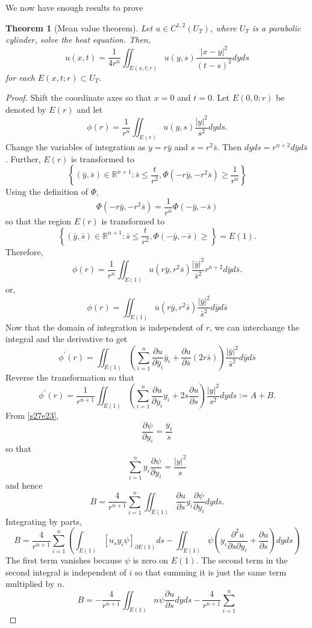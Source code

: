 \documentclass{article}
\newcommand{\pd}[2]{\frac{\partial{#1}}{\partial{#2}}}
\theoremstyle{plain}
\newtheorem{thm}{Theorem}
\numberwithin{thm}{section}
\theoremstyle{plain}
\numberwithin{prop}{section}
\theoremstyle{definition}
\numberwithin{defn}{section}
\theoremstyle{remark}
\numberwithin{equation}{section}
\begin{document}
We now have enough results to prove
\begin{thm}[Mean value theorem]\label{s27t3}
Let $u \in C^{1, 2}(U_T)$, where $U_T$ is a parabolic cylinder, solve the heat equation. Then,
\[
u(x, t) = \frac{1}{4r^n}\iint_{E(x,t;r)} u(y, s)\frac{|x - y|^2}{(t - s)^2}dyds
\]
for each $E(x,t;r) \subset U_T$.
\end{thm}
\begin{proof}
Shift the coordinate axes so that $x = 0$ and $t = 0$. Let $E(0, 0; r)$ be denoted by $E(r)$ and let
\[
\phi(r) = \frac{1}{r^n}\iint_{E(r)} u(y, s)\frac{|y|^2}{s^2}dyds.
\]
Change the variables of integration as $y = r\bar{y}$ and $s = r^2\bar{s}$. Then $dyds = r^{n+2}d\bar{y} 
d\bar{s}$. Further, $E(r)$ is transformed to
\[
\left\{(\bar{y}, \bar{s}) \in \mathbb{R}^{n+1}: \bar{s} \le \frac{t}{r^2}, 
\Phi\left(-r\bar{y}, -r^2\bar{s}\right) \ge \frac{1}{r^n}\right\}
\]
Using the definition of $\Phi$,
\[
\Phi\left(-r\bar{y}, -r^2\bar{s}\right) = \frac{1}{r^n}\Phi(-\bar{y}, -\bar{s})
\]
so that the region $E(r)$ is transformed to 
\[
\left\{(\bar{y}, \bar{s}) \in \mathbb{R}^{n+1}: \bar{s} \le \frac{t}{r^2}, 
\Phi(-\bar{y}, -\bar{s}) \ge \right\} = E(1).
\]
Therefore,
\[
\phi(r) = \frac{1}{r^n}\iint_{E(1)} u(r\bar{y}, r^2\bar{s})\frac{|\bar{y}|^2}{{\bar{s}}^2} r^{n+2}
d\bar{y} d\bar{s}.
\]
or,
\[
\phi(r) = \iint_{E(1)} u(r\bar{y}, r^2\bar{s})\frac{|\bar{y}|^2}{{\bar{s}}^2}d\bar{y} d\bar{s}
\]
Now that the domain of integration is independent of $r$, we can interchange the integral and the derivative to
get
\[
\phi^\prime(r) = \iint_{E(1)}\left(\sum_{i=1}^n\pd{u}{\bar{y}_i}\bar{y}_i +
\pd{u}{\bar{s}}(2r\bar{s})\right)\frac{|\bar{y}|^2}{\bar{s}^2}d\bar{y} d\bar{s}
\]
Reverse the transformation so that
\[
\phi^\prime(r) = \frac{1}{r^{n+1}}\iint_{E(1)}\left(\sum_{i=1}^n\pd{u}{y_i}y_i +
2s\pd{u}{s}\right)\frac{|y|^2}{s^2}dy ds := A + B.
\]
From \eqref{s27e23},
\[
\pd{\psi}{y_i} = \frac{y_i}{s}
\]
so that
\[
\sum_{i=1}^n y_i\pd{\psi}{y_i} = \frac{|y|^2}{s}
\]
and hence
\[
B = \frac{4}{r^{n+1}}\sum_{i=1}^n \iint_{E(1)}\pd{u}{s} y_i\pd{\psi}{y_i} dyds.
\]
Integrating by parts,
\[
B = \frac{4}{r^{n+1}}\sum_{i=1}^n\left(\int_{E(1)} \left[u_sy_i\psi\right]_{\partial E(1)} ds -
\iint_{E(1)} \psi\left(y_i\frac{\partial^2u}{\partial s\partial y_i} + \pd{u}{s}\right)dyds\right)
\]
The first term vanishes because $\psi$ is zero on $E(1)$. The second term in the second integral is independent
of $i$ so that summing it is just the same term multiplied by $n$.
\[
B = 
-\frac{4}{r^{n+1}}\iint_{E(1)}n\psi\pd{u}{s}dyds - \frac{4}{r^{n+1}}\sum_{i=1}^n
\]
\end{proof}
\end{document}
